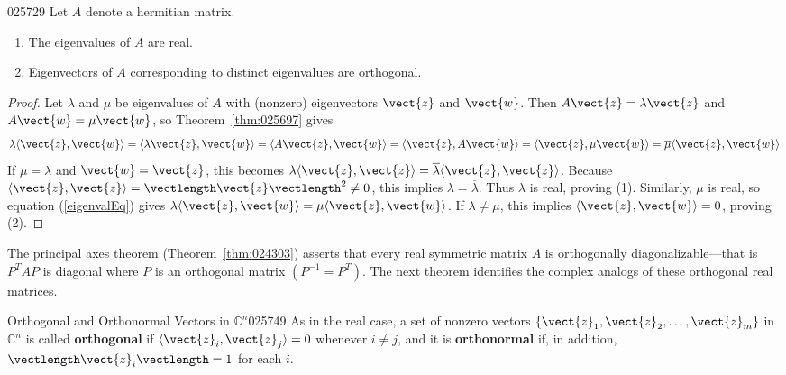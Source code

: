 \begin{theorem}{}{025729}
Let $A$ denote a hermitian matrix.

\begin{enumerate}
\item The eigenvalues of $A$ are real.

\item Eigenvectors of $A$ corresponding to distinct eigenvalues are orthogonal.

\end{enumerate}
\end{theorem}

\begin{proof}
Let $\lambda$ and $\mu$ be eigenvalues of $A$ with (nonzero) eigenvectors $\vect{z}$ and $\vect{w}$. Then $A\vect{z} = \lambda \vect{z}$ and $A\vect{w} = \mu \vect{w}$, so Theorem~\ref{thm:025697} gives
\begin{equation} \label{eigenvalEq}
\lambda \langle \vect{z}, \vect{w} \rangle = \langle \lambda \vect{z}, \vect{w} \rangle = \langle A\vect{z}, \vect{w} \rangle = \langle \vect{z}, A\vect{w} \rangle = \langle \vect{z}, \mu \vect{w} \rangle = \overline{\mu} \langle \vect{z}, \vect{w} \rangle
\end{equation}
If $\mu = \lambda$ and $\vect{w} = \vect{z}$, this becomes $\lambda \langle \vect{z}, \vect{z} \rangle  = \overline{\lambda} \langle \vect{z}, \vect{z} \rangle$. Because $\langle \vect{z}, \vect{z} \rangle = \vectlength\vect{z}\vectlength^{2} \neq 0$, this implies $\lambda = \overline{\lambda}$. Thus $\lambda$ is real, proving (1). Similarly, $\mu$ is real, so equation (\ref{eigenvalEq}) gives $\lambda \langle \vect{z}, \vect{w} \rangle = \mu \langle \vect{z}, \vect{w} \rangle$. If $\lambda \neq \mu$, this implies $\langle \vect{z}, \vect{w} \rangle = 0$, proving (2).
\end{proof}

The principal axes theorem (Theorem~\ref{thm:024303}) asserts that every real symmetric matrix $A$ is orthogonally diagonalizable---that is $P^{T}AP$ is diagonal where $P$ is an orthogonal matrix $(P^{-1} = P^{T})$. The next theorem identifies the complex analogs of these orthogonal real matrices.

\begin{definition}{Orthogonal and Orthonormal Vectors in $\mathbb{C}^n$}{025749}
As in the real case, a set of nonzero vectors $\{\vect{z}_{1}, \vect{z}_{2}, \dots, \vect{z}_{m}\}$ in $\mathbb{C}^n$ is called \textbf{orthogonal} if $\langle \vect{z}_{i}, \vect{z}_{j}\rangle = 0$ whenever $i \neq j$, and it is \textbf{orthonormal} if, in addition, $\vectlength\vect{z}_{i} \vectlength = 1$ for each $i$.
\end{definition}


